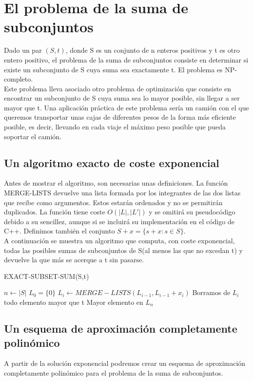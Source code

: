 \documentclass{article}
\begin{document}
\section{El problema de la suma de subconjuntos}
Dado un par $(S,t)$, donde S es un conjunto de n enteros positivos y t es otro entero positivo, el problema de la suma de subconjuntos consiste en determinar si existe un subconjunto de S cuya suma sea exactamente t. El problema es NP-completo.\\

Este problema lleva asociado otro problema de optimización que consiste en encontrar un subconjunto de S cuya suma sea lo mayor posible, sin llegar a ser mayor que t. Una aplicación práctica de este problema sería un camión con el que queremos transportar unas cajas de diferentes pesos de la forma más eficiente posible, es decir, llevando en cada viaje el máximo peso posible que pueda soportar el camión.

\subsection{Un algoritmo exacto de coste exponencial}
Antes de mostrar el algoritmo, son necesarias unas definiciones. La función MERGE-LISTS devuelve una lista formada por los integrantes de las dos listas que recibe como argumentos. Estos estarán ordenados y no se permitirán duplicados. La función tiene coste $O(|L|,|L'|)$ y se omitirá su pseudocódigo debido a su sencillez, aunque si se incluirá su implementación en el código de C++. Definimos también el conjunto $S + x = \{ s + x : s \in S\}$.\\

A continuación se muestra un algoritmo que computa, con coste exponencial, todas las posibles sumas de subconjuntos de S(al menos las que no excedan  t) y devuelve la que más se acerque a t sin pasarse. \\

\begin{algorithm}[H]
\caption{EXACT-SUBSET-SUM(S,t)}
\begin{algorithmic}[1]
\STATE $n \gets |S|$
\STATE $L_0 = \{0\} $
\STATE $L_i \gets MERGE-LISTS(L_{i-1}, L_{i-1} + x_i)$
\STATE Borramos de $L_i$ todo elemento mayor que t
\ENDFOR
\RETURN Mayor elemento en $L_n$
\end{algorithmic}
\end{algorithm}
  
\subsection{Un esquema de aproximación completamente polinómico}
A partir de la solución exponencial podremos crear un esquema de aproximación completamente polinómico para el problema de la suma de subconjuntos.\\
\end{document}
